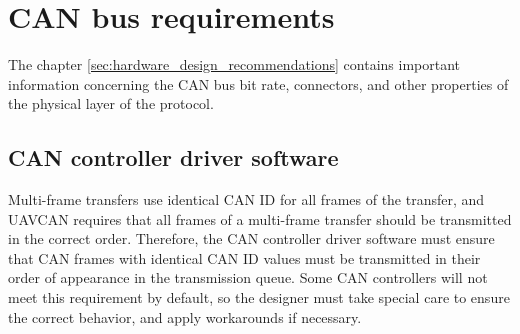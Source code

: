 \section{CAN bus requirements}

The chapter \ref{sec:hardware_design_recommendations} contains important information
concerning the CAN bus bit rate, connectors, and other properties of the physical layer of the protocol.

\subsection{CAN controller driver software}

Multi-frame transfers use identical CAN ID for all frames of the transfer,
and UAVCAN requires that all frames of a multi-frame transfer should be transmitted in the correct order.
Therefore, the CAN controller driver software must ensure that CAN frames with identical CAN ID values
must be transmitted in their order of appearance in the transmission queue.
Some CAN controllers will not meet this requirement by default,
so the designer must take special care to ensure the correct behavior, and apply workarounds if necessary.
